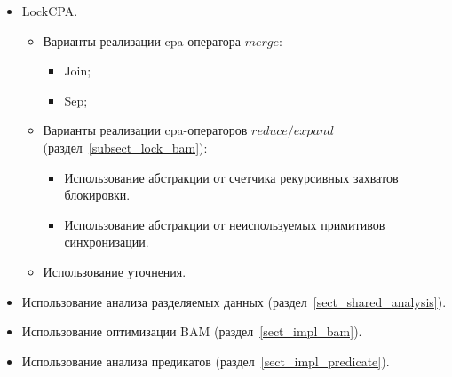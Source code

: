 \begin{itemize}
\item LockCPA.
\begin{itemize}
\item Варианты реализации cpa-оператора $merge$:
\begin{itemize}
\item Join;
\item Sep;
\end{itemize}
\item Варианты реализации cpa-операторов $reduce/expand$ (раздел~\ref{subsect_lock_bam}):
\begin{itemize}
\item Использование абстракции от счетчика рекурсивных захватов блокировки.
\item Использование абстракции от неиспользуемых примитивов синхронизации.
\end{itemize}
\item Использование уточнения.
\end{itemize}
\item Использование анализа разделяемых данных (раздел~\ref{sect_shared_analysis}).
\item Использование оптимизации BAM (раздел~\ref{sect_impl_bam}).
\item Использование анализа предикатов (раздел~\ref{sect_impl_predicate}).
\end{itemize}

